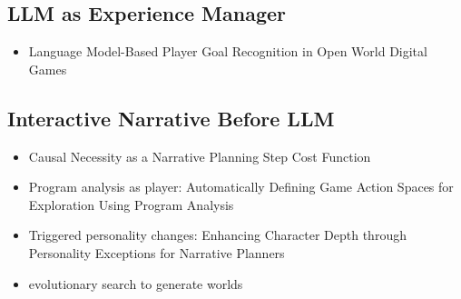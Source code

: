 \subsection{LLM as Experience Manager}
\begin{itemize}
    \item Language Model-Based Player Goal Recognition in Open World Digital Games \cite{kim2023language}

\end{itemize}

\subsection{Interactive Narrative Before LLM}
\begin{itemize}
    \item Causal Necessity as a Narrative Planning Step Cost Function \cite{ware2023causal}
    \item Program analysis as player: Automatically Defining Game Action Spaces for Exploration Using Program Analysis \cite{volokh2023automatically}
    \item Triggered personality changes: Enhancing Character Depth through Personality Exceptions for Narrative Planners \cite{rubin2023enhancing}
    \item evolutionary search to generate worlds \cite{robertson2023evolving}

\end{itemize}


